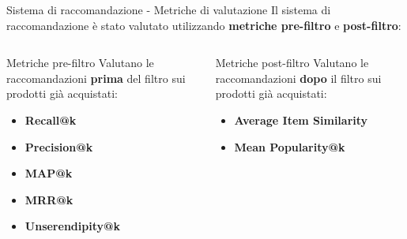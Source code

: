 \documentclass{beamer}
\begin{document}
	\begin{frame}{Sistema di raccomandazione - Metriche di valutazione}
		Il sistema di raccomandazione è stato valutato utilizzando \textbf{metriche pre-filtro} e \textbf{post-filtro}:

		\begin{columns}
			\begin{column}{0.5\textwidth}
				\begin{exampleblock}{Metriche pre-filtro}
					Valutano le raccomandazioni \textbf{prima} del filtro sui prodotti già acquistati:
					\begin{itemize}
						\item \textbf{Recall@k}
						\item \textbf{Precision@k}
						\item \textbf{MAP@k}
						\item \textbf{MRR@k}
						\item \textbf{Unserendipity@k}
					\end{itemize}
				\end{exampleblock}
			\end{column}
			\begin{column}{0.5\textwidth}
				\begin{exampleblock}{Metriche post-filtro}
					Valutano le raccomandazioni \textbf{dopo} il filtro sui prodotti già acquistati:
					\begin{itemize}
						\item \textbf{Average Item Similarity}
						\item \textbf{Mean Popularity@k}
					\end{itemize}
				\end{exampleblock}
			\end{column}
		\end{columns}
	\end{frame}
\end{document}
